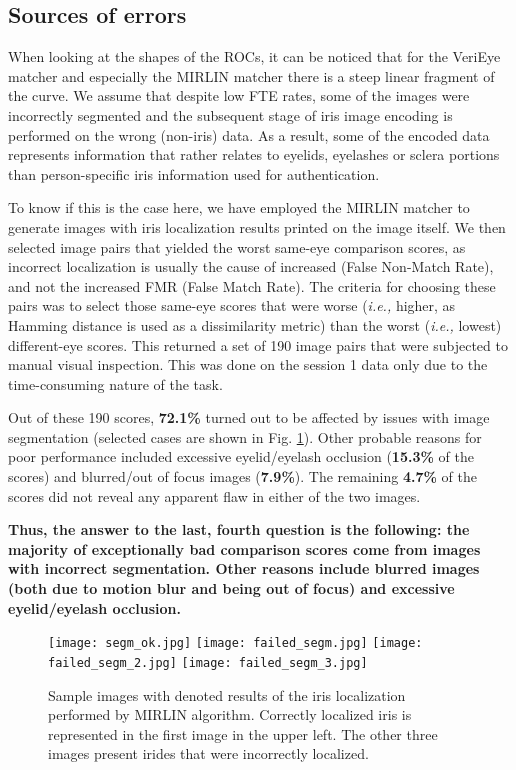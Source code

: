 \documentclass[10pt,twocolumn,letterpaper]{article}
\begin{document}
\subsection{Sources of errors}
When looking at the shapes of the ROCs, it can be noticed that for the VeriEye matcher and especially the MIRLIN matcher there is a steep linear fragment of the curve. We assume that despite low FTE rates, some of the images were incorrectly segmented and the subsequent stage of iris image encoding is performed on the wrong (non-iris) data. As a result, some of the encoded data represents information that rather relates to eyelids, eyelashes or sclera portions than person-specific iris information used for authentication. 

To know if this is the case here, we have employed the MIRLIN matcher to generate images with iris localization results printed on the image itself. We then selected image pairs that yielded the worst same-eye comparison scores, as incorrect localization is usually the cause of increased (False Non-Match Rate), and not the increased FMR (False Match Rate). The criteria for choosing these pairs was to select those same-eye scores that were worse (\emph{i.e.,} higher, as Hamming distance is used as a dissimilarity metric) than the worst (\emph{i.e.,} lowest) different-eye scores. This returned a set of 190 image pairs that were subjected to manual visual inspection. This was done on the session 1 data only due to the time-consuming nature of the task.

Out of these 190 scores, \textbf{72.1\%} turned out to be affected by issues with image segmentation (selected cases are shown in Fig. \ref{fig:segmentation}). Other probable reasons for poor performance included excessive eyelid/eyelash occlusion (\textbf{15.3\%} of the scores) and blurred/out of focus images (\textbf{7.9\%}). The remaining \textbf{4.7\%} of the scores did not reveal any apparent flaw in either of the two images. 


\textbf{Thus, the answer to the last, fourth question is the following: the majority of exceptionally bad comparison scores come from images with incorrect segmentation. Other reasons include blurred images (both due to motion blur and being out of focus) and excessive eyelid/eyelash occlusion.}

\begin{figure}[!t]
\centering
\texttt{[image: segm\_ok.jpg]}\hfill
\texttt{[image: failed\_segm.jpg]}\vfill
\texttt{[image: failed\_segm\_2.jpg]}\hfill
\texttt{[image: failed\_segm\_3.jpg]}
\vskip0.2cm
\caption{Sample images with denoted results of the iris localization performed by MIRLIN algorithm. Correctly localized iris is represented in the first image in the upper left. The other three images present irides that were incorrectly localized.}
\label{fig:segmentation}
\end{figure}
\end{document}
